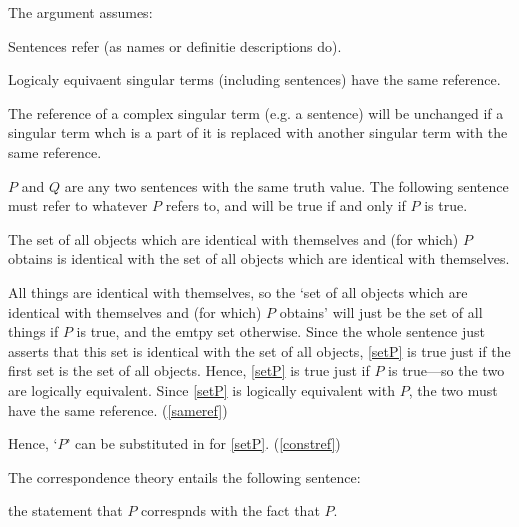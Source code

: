 
The argument assumes:

	\begin{thesis} \label{srefer}
	Sentences refer (as names or definitie descriptions do).
	\end{thesis}


	\begin{thesis} \label{sameref}
	Logicaly equivaent singular terms (including sentences) have the same reference.
	\end{thesis}

	
	\begin{thesis} \label{constref}
	The reference of a complex singular term (e.g. a sentence) will be unchanged if a singular term whch is a part of it is replaced with another singular term with the same reference.
	\end{thesis}
	
$P$ and $Q$ are any two sentences with the same truth value. 
The following sentence must refer to whatever $P$ refers to, and will be true if and only if $P$ is true.

	\begin{example} \label{setP}
	The set of all objects which are identical with themselves and (for which) $P$ obtains is identical with the set of all objects which are identical with themselves.
	\end{example}

All things are identical with themselves, so the `set of all objects which are identical with themselves and (for which) $P$ obtains' will just be the set of all things if $P$ is true, and the emtpy set otherwise.
Since the whole sentence just asserts that this set is identical with the set of all objects, \ref{setP} is true just if the first set is the set of all objects.
Hence, \ref{setP} is true just if $P$ is true---so the two are logically equivalent.
Since \ref{setP} is logically equivalent with $P$, the two must have the same reference. 
(\ref{sameref})

Hence, `$P$' can be substituted in for \ref{setP}. (\ref{constref})

The correspondence theory entails the following sentence:

	\begin{example} \label{stateP}
	the statement that $P$ correspnds with the fact that $P$.
	\end{example}

